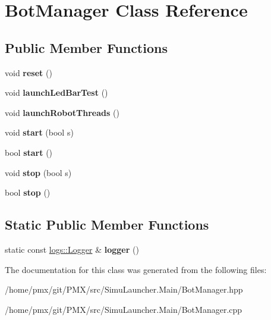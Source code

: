 \hypertarget{classBotManager}{}\section{Bot\+Manager Class Reference}
\label{classBotManager}
\subsection*{Public Member Functions}
\begin{DoxyCompactItemize}
\item 
\mbox{\label{classBotManager_abdf5b57d92b543f810716d9c083a326f}} 
void {\bfseries reset} ()
\item 
\mbox{\label{classBotManager_a21bcc3dd4cd9a9e2f61c1702ec1d9a9c}} 
void {\bfseries launch\+Led\+Bar\+Test} ()
\item 
\mbox{\label{classBotManager_af09e9a4f1767ab1e6588c10d1b157632}} 
void {\bfseries launch\+Robot\+Threads} ()
\item 
\mbox{\label{classBotManager_aa615ca9fcccd486269ccacb76982867b}} 
void {\bfseries start} (bool s)
\item 
\mbox{\label{classBotManager_a36c82677a4f7a6e13fb0a380107239f3}} 
bool {\bfseries start} ()
\item 
\mbox{\label{classBotManager_ab7827d61894a8d29bcd37c75dc85b0cc}} 
void {\bfseries stop} (bool s)
\item 
\mbox{\label{classBotManager_a78f789b2a5401f442035b92dd2f25501}} 
bool {\bfseries stop} ()
\end{DoxyCompactItemize}
\subsection*{Static Public Member Functions}
\begin{DoxyCompactItemize}
\item 
\mbox{\label{classBotManager_a7fa667fb483a4ab32ec9ad151b0a7afe}} 
static const \hyperlink{classlogs_1_1Logger}{logs\+::\+Logger} \& {\bfseries logger} ()
\end{DoxyCompactItemize}


The documentation for this class was generated from the following files\+:\begin{DoxyCompactItemize}
\item 
/home/pmx/git/\+P\+M\+X/src/\+Simu\+Launcher.\+Main/Bot\+Manager.\+hpp\item 
/home/pmx/git/\+P\+M\+X/src/\+Simu\+Launcher.\+Main/Bot\+Manager.\+cpp\end{DoxyCompactItemize}
